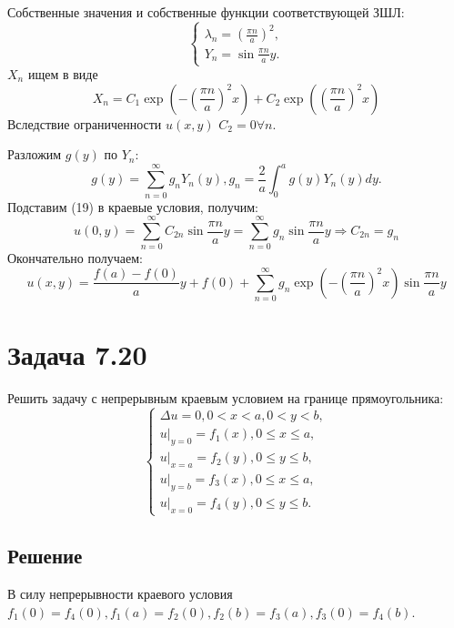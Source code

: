 \documentclass[11pt]{article}
\begin{document}
Собственные значения и собственные функции соответствующей ЗШЛ:
\begin{equation*}
\begin{cases}
\lambda_n = \left(\frac{\pi n}a\right)^2, \\
Y_n = \sin\frac{\pi n}ay.
\end{cases}
\end{equation*}
$X_n$ ищем в виде
\begin{equation}
X_n = C_1\exp\left(-\left(\frac{\pi n}a\right)^2x\right) + C_2\exp\left(\left(\frac{\pi n}a\right)^2x\right)
\end{equation}
Вследствие ограниченности $u(x, y)$ $C_2 = 0 \forall n$.

Разложим $g(y)$ по $Y_n$:
\begin{equation*}
g(y) = \sum_{n = 0}^{\infty}g_nY_n(y), g_n = \frac2a\int_0^ag(y)Y_n(y)dy.
\end{equation*}
Подставим (19) в краевые условия, получим:
\begin{equation*}
u(0, y) = \sum_{n = 0}^{\infty}C_{2n}\sin\frac{\pi n}ay = \sum_{n = 0}^{\infty}g_n\sin\frac{\pi n}ay
\Rightarrow C_{2n} = g_n
\end{equation*}
Окончательно получаем:
\begin{equation}
u(x, y) = \frac{f(a) - f(0)}ay + f(0) + \sum_{n = 0}^{\infty}g_n\exp\left(-\left(\frac{\pi n}a\right)^2x\right)\sin\frac{\pi n}ay
\end{equation}
\section{Задача 7.20}
\label{sec:orgd58fb3a}
Решить задачу с непрерывным краевым условием на границе прямоугольника:
\begin{equation}
\begin{cases}
\Delta u = 0, 0 < x < a, 0 < y < b, \\
u|_{y = 0} = f_1(x), 0 \leq x \leq a, \\
u|_{x = a} = f_2(y), 0 \leq y \leq b, \\
u|_{y = b} = f_3(x), 0 \leq x \leq a, \\
u|_{x = 0} = f_4(y), 0 \leq y \leq b.
\end{cases}
\end{equation}
\subsection{Решение}
\label{sec:orga3ba72c}
В силу непрерывности краевого условия $f_1(0) = f_4(0), f_1(a) = f_2(0), f_2(b) = f_3(a), f_3(0) = f_4(b)$.
\end{document}
